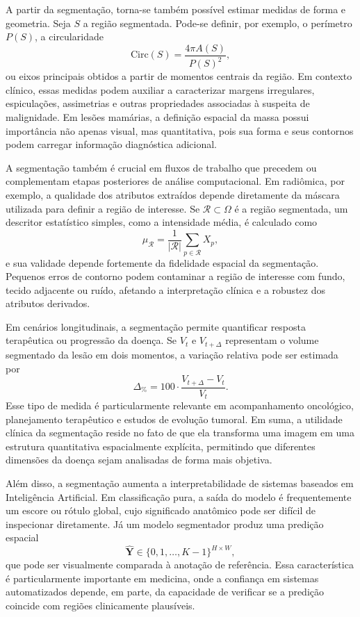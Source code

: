 \documentclass[tcc,capa]{texufpel}
\begin{document}
A partir da segmentação, torna-se também possível estimar medidas de forma e geometria. Seja \(S\) a região segmentada. Pode-se definir, por exemplo, o perímetro \(P(S)\), a circularidade
\begin{equation}
	\mathrm{Circ}(S) = \frac{4\pi A(S)}{P(S)^2},
\end{equation}
ou eixos principais obtidos a partir de momentos centrais da região. Em contexto clínico, essas medidas podem auxiliar a caracterizar margens irregulares, espiculações, assimetrias e outras propriedades associadas à suspeita de malignidade. Em lesões mamárias, a definição espacial da massa possui importância não apenas visual, mas quantitativa, pois sua forma e seus contornos podem carregar informação diagnóstica adicional.

A segmentação também é crucial em fluxos de trabalho que precedem ou complementam etapas posteriores de análise computacional. Em radiômica, por exemplo, a qualidade dos atributos extraídos depende diretamente da máscara utilizada para definir a região de interesse. Se \(\mathcal{R}\subset\Omega\) é a região segmentada, um descritor estatístico simples, como a intensidade média, é calculado como
\begin{equation}
	\mu_{\mathcal{R}} = \frac{1}{|\mathcal{R}|}\sum_{p \in \mathcal{R}} X_p,
\end{equation}
e sua validade depende fortemente da fidelidade espacial da segmentação. Pequenos erros de contorno podem contaminar a região de interesse com fundo, tecido adjacente ou ruído, afetando a interpretação clínica e a robustez dos atributos derivados.

Em cenários longitudinais, a segmentação permite quantificar resposta terapêutica ou progressão da doença. Se \(V_t\) e \(V_{t+\Delta}\) representam o volume segmentado da lesão em dois momentos, a variação relativa pode ser estimada por
\begin{equation}
	\Delta_{\%} = 100 \cdot \frac{V_{t+\Delta} - V_t}{V_t}.
\end{equation}
Esse tipo de medida é particularmente relevante em acompanhamento oncológico, planejamento terapêutico e estudos de evolução tumoral. Em suma, a utilidade clínica da segmentação reside no fato de que ela transforma uma imagem em uma estrutura quantitativa espacialmente explícita, permitindo que diferentes dimensões da doença sejam analisadas de forma mais objetiva.

Além disso, a segmentação aumenta a interpretabilidade de sistemas baseados em Inteligência Artificial. Em classificação pura, a saída do modelo é frequentemente um escore ou rótulo global, cujo significado anatômico pode ser difícil de inspecionar diretamente. Já um modelo segmentador produz uma predição espacial
\begin{equation}
	\hat{\mathbf{Y}} \in \{0,1,\dots,K-1\}^{H \times W},
\end{equation}
que pode ser visualmente comparada à anotação de referência. Essa característica é particularmente importante em medicina, onde a confiança em sistemas automatizados depende, em parte, da capacidade de verificar se a predição coincide com regiões clinicamente plausíveis.
\end{document}
